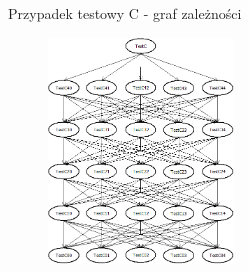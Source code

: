 \documentclass{beamer}
\begin{document}
\begin{frame}{Przypadek testowy C - graf zależności}
\begin{figure}[H]
	\begin{center}
  		\includegraphics[height=6cm]{TestC.png}
	\end{center}
\end{figure}
\end{frame}
\end{document}
